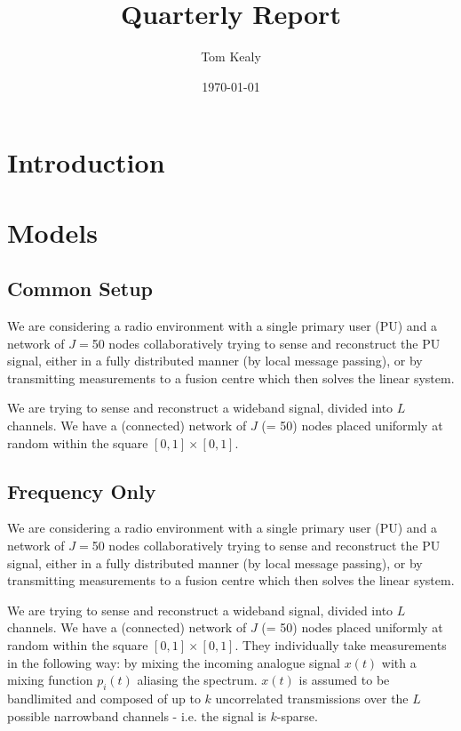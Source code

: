 \documentclass{article}
\title{Quarterly Report}
\begin{document}
\date{\today}
\author{Tom Kealy}
\maketitle
\section{Introduction}

\section{Models}

\subsection{Common Setup}
We are considering a radio environment with a single primary user (PU) and a network of \(J=\)50 nodes collaboratively trying to sense and reconstruct the PU signal, either in a fully distributed manner (by local message passing), or by transmitting measurements to a fusion centre which then solves the linear system. 

We are trying to sense and reconstruct a wideband signal, divided into \(L\) channels. We have a (connected) network of \(J\) (= 50) nodes placed uniformly at random within the square \(  \left[0,1\right]\times \left[0,1\right] \).

\subsection{Frequency Only}

\label{sensingmodel}
We are considering a radio environment with a single primary user (PU) and a network of \(J=\)50 nodes collaboratively trying to sense and reconstruct the PU signal, either in a fully distributed manner (by local message passing), or by transmitting measurements to a fusion centre which then solves the linear system. 

We are trying to sense and reconstruct a wideband signal, divided into \(L\) channels. We have a (connected) network of \(J\) (= 50) nodes placed uniformly at random within the square \(  \left[0,1\right]\times \left[0,1\right] \). They individually take measurements in the following way: by mixing the incoming analogue signal \(x\left(t\right)\) with a mixing function \(p_i\left(t\right)\) aliasing the spectrum. \(x\left(t\right)\) is assumed to be bandlimited and composed of up to \(k\) uncorrelated transmissions over the \(L\) possible narrowband channels - i.e. the signal is \(k\)-sparse. 
\end{document}
